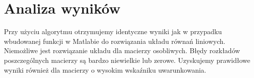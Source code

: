 \documentclass[11pt]{article}
\begin{document}
\section{Analiza wyników}
Przy użyciu algorytmu otrzymujemy identyczne wyniki jak w przypadku wbudowanej funkcji w Matlabie do rozwiązania układu równań liniowych. Niemożliwe jest rozwiązanie układu dla macierzy osobliwych. Błędy rozkładów poszczególnych macierzy są bardzo niewielkie lub zerowe. Uzyskujemy prawidłowe wyniki również dla macierzy o wysokim wskaźniku uwarunkowania.
\end{document}
